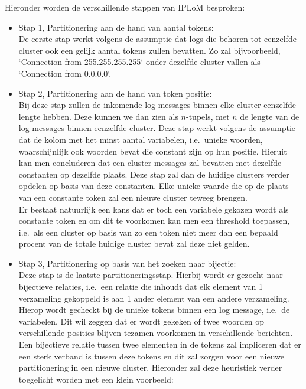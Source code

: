 Hieronder worden de verschillende stappen van IPLoM besproken: 
\begin{itemize}
    \item Stap 1, Partitionering aan de hand van aantal tokens:\\
    De eerste stap werkt volgens de assumptie dat logs die behoren tot eenzelfde cluster ook een gelijk aantal tokens zullen bevatten. Zo zal bijvoorbeeld, `Connection from 255.255.255.255` onder dezelfde cluster vallen als `Connection from 0.0.0.0`.\\
    
    \item Stap 2, Partitionering aan de hand van token positie:\\
    Bij deze stap zullen de inkomende log messages binnen elke cluster eenzelfde lengte hebben. Deze kunnen we dan zien als $n$-tupels, met $n$ de lengte van de log messages binnen eenzelfde cluster. Deze stap werkt volgens de assumptie dat de kolom met het minst aantal variabelen, i.e.\ unieke woorden, waarschijnlijk ook woorden bevat die constant zijn op hun positie. Hieruit kan men concluderen dat een cluster messages zal bevatten met dezelfde constanten op dezelfde plaats. Deze stap zal dan de huidige clusters verder opdelen op basis van deze constanten. Elke unieke waarde die op de plaats van een constante token zal een nieuwe cluster teweeg brengen.\\
    
    Er bestaat natuurlijk een kans dat er toch een variabele gekozen wordt als constante token en om dit te voorkomen kan men een threshold toepassen, i.e.\ als een cluster op basis van zo een token niet meer dan een bepaald procent van de totale huidige cluster bevat zal deze niet gelden.\\
    
    \item Stap 3, Partitionering op basis van het zoeken naar bijectie:\\
    
    Deze stap is de laatste partitioneringsstap. Hierbij wordt er gezocht naar bijectieve relaties, i.e.\ een relatie die inhoudt dat elk element van 1 verzameling gekoppeld is aan 1 ander element van een andere verzameling. Hierop wordt gecheckt bij de unieke tokens binnen een log message, i.e.\ de variabelen. Dit wil zeggen dat er wordt gekeken of twee woorden op verschillende posities blijven tezamen voorkomen in verschillende berichten. Een bijectieve relatie tussen twee elementen in de tokens zal impliceren dat er een sterk verband is tussen deze tokens en dit zal zorgen voor een nieuwe partitionering in een nieuwe cluster. Hieronder zal deze heuristiek verder toegelicht worden met een klein voorbeeld:\\
    

\end{itemize}
